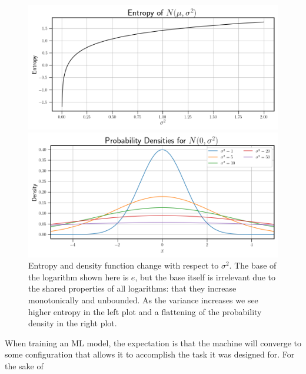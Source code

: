 \begin{figure}[ht]
    \centering
    \begin{minipage}{.5\textwidth}
        \includegraphics[width=\textwidth]{Figures/entropy_example.png}
    \end{minipage}%
    \begin{minipage}{.5\textwidth}
        \includegraphics[width=\textwidth]{Figures/densities_example.png}
    \end{minipage}

    \caption{Entropy and density function change with respect to $\sigma^2$. The base 
    of the logarithm shown here is $e$, but the base itself is irrelevant due to the shared
    properties of all logarithms: that they increase monotonically and unbounded. As the 
    variance increases we see higher entropy in the left plot and a flattening of the 
    probability density in the right plot.}
    \label{fig:entropy example}
\end{figure}


When training an ML model, the expectation is that the machine will converge to some 
configuration that allows it to accomplish the task it was designed for. For the sake of 

